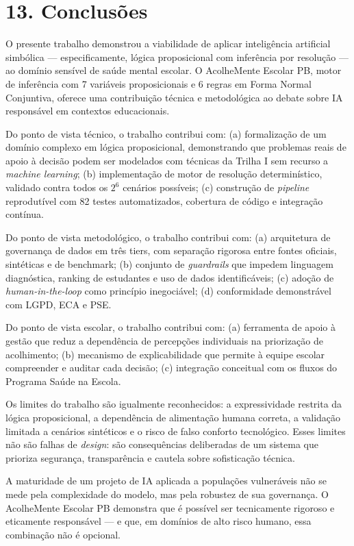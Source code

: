 \documentclass[11pt]{article}
\begin{document}
    \section{13. Conclusões}\label{conclusuxf5es}

O presente trabalho demonstrou a viabilidade de aplicar inteligência
artificial simbólica --- especificamente, lógica proposicional com
inferência por resolução --- ao domínio sensível de saúde mental
escolar. O AcolheMente Escolar PB, motor de inferência com 7 variáveis
proposicionais e 6 regras em Forma Normal Conjuntiva, oferece uma
contribuição técnica e metodológica ao debate sobre IA responsável em
contextos educacionais.

Do ponto de vista técnico, o trabalho contribui com: (a) formalização de
um domínio complexo em lógica proposicional, demonstrando que problemas
reais de apoio à decisão podem ser modelados com técnicas da Trilha I
sem recurso a \emph{machine learning}; (b) implementação de motor de
resolução determinístico, validado contra todos os \(2^6\) cenários
possíveis; (c) construção de \emph{pipeline} reprodutível com 82 testes
automatizados, cobertura de código e integração contínua.

Do ponto de vista metodológico, o trabalho contribui com: (a)
arquitetura de governança de dados em três tiers, com separação rigorosa
entre fontes oficiais, sintéticas e de benchmark; (b) conjunto de
\emph{guardrails} que impedem linguagem diagnóstica, ranking de
estudantes e uso de dados identificáveis; (c) adoção de
\emph{human-in-the-loop} como princípio inegociável; (d) conformidade
demonstrável com LGPD, ECA e PSE.

Do ponto de vista escolar, o trabalho contribui com: (a) ferramenta de
apoio à gestão que reduz a dependência de percepções individuais na
priorização de acolhimento; (b) mecanismo de explicabilidade que permite
à equipe escolar compreender e auditar cada decisão; (c) integração
conceitual com os fluxos do Programa Saúde na Escola.

Os limites do trabalho são igualmente reconhecidos: a expressividade
restrita da lógica proposicional, a dependência de alimentação humana
correta, a validação limitada a cenários sintéticos e o risco de falso
conforto tecnológico. Esses limites não são falhas de \emph{design}: são
consequências deliberadas de um sistema que prioriza segurança,
transparência e cautela sobre sofisticação técnica.

A maturidade de um projeto de IA aplicada a populações vulneráveis não
se mede pela complexidade do modelo, mas pela robustez de sua
governança. O AcolheMente Escolar PB demonstra que é possível ser
tecnicamente rigoroso e eticamente responsável --- e que, em domínios de
alto risco humano, essa combinação não é opcional.
\end{document}
